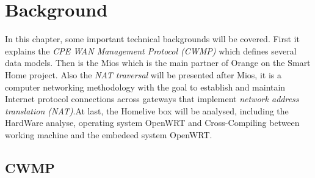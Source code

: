 
\chapter{Background} %

\label{Chapter3} %




In this chapter, some important technical backgrounds will be covered. First it explains the \textit{CPE WAN Management Protocol (CWMP)} which defines several data models. Then is the Mios which is the main partner of Orange on the Smart Home project. Also the \textit{NAT traversal} will be presented after Mios, it is a computer networking methodology with the goal to establish and maintain Internet protocol connections across gateways that implement \textit{network address translation (NAT)}.At last, the Homelive box will be analysed, including the HardWare analyse, operating system OpenWRT and Cross-Compiling between working machine and the embedeed system OpenWRT.

\section{CWMP}

